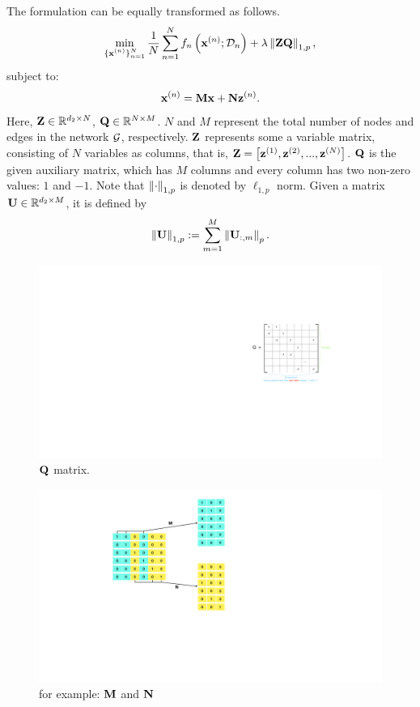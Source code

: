 \documentclass[journal]{IEEEtran}
\begin{document}
The formulation can be equally transformed as follows.
\begin{align}
\min_{\substack{\{{\bf x}^{(n)}\}_{n=1}^N}} \frac{1}{N}\sum_{n=1}^N f_n\left( {\bf x}^{(n)}; \mathcal{D}_n \right) + \lambda \left\lVert{\bf Z}{\bf Q}\right\rVert_{1,p},
\end{align} subject to:
\begin{align}
{\bf x}^{(n)} = {\bf M}{\bf x} + {\bf N} {\bf z}^{(n)}.
\end{align} Here, ${\bf Z}\in\mathbb{R}^{d_2 \times N}$, ${\bf Q}\in\mathbb{R}^{N\times M}$. $N$ and $M$ represent the total number of nodes and edges in the network ${\mathcal{G}}$, respectively. 
${\bf Z}$ represents some a variable matrix, consisting of $N$ variables as columns, that is, ${\bf Z} = \left [{\bf z}^{(1)}, {\bf z}^{(2)}, ..., {\bf z}^{(N)} \right ]$. ${\bf Q}$ is the given auxiliary matrix, which has $M$ columns and every column has two non-zero values: $1$ and $-1$. Note that $\left\lVert\cdot\right\rVert_{1,p}$ is denoted by $\ell_{1,p}$ norm. Given a matrix ${\bf U}\in\mathbb{R}^{d_2 \times M}$, it is defined by 
\begin{align}
\nonumber
\left\lVert{\bf U}\right\rVert_{1,p} := \sum_{m=1}^M \left\lVert{\bf U}_{:, m}\right\rVert_p.
\end{align}

\begin{figure}[!t]
\setlength{\abovecaptionskip}{0pt}
\setlength{\belowcaptionskip}{0pt}
\centering 
\includegraphics[width=0.97\columnwidth]{figs/figs_Q_matrix}
\caption{${\bf Q}$ matrix.}
\label{figure_xxx}
\end{figure}


\begin{figure}[!t]
\setlength{\abovecaptionskip}{0pt}
\setlength{\belowcaptionskip}{0pt}
\centering 
\includegraphics[width=0.97\columnwidth]{figs/figs_MNmatrix}
\caption{for example: ${\bf M}$ and ${\bf N}$ }
\label{figure_xxx}
\end{figure}
\end{document}
